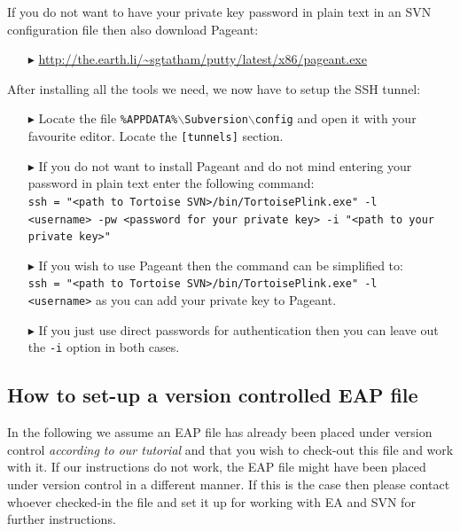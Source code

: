 If you do not want to have your private key password in plain text in an SVN configuration file then also download Pageant:
\begin{enumerate}
  \item[$\blacktriangleright$] {\small \url{http://the.earth.li/~sgtatham/putty/latest/x86/pageant.exe}}  
\end{enumerate}

After installing all the tools we need, we now have to setup the SSH tunnel:
   
\begin{enumerate}
  \item[$\blacktriangleright$] Locate the file \texttt{\%APPDATA\%$\backslash$Subversion$\backslash$config} and open it with your favourite editor. Locate the \texttt{[tunnels]} section.
  \item[$\blacktriangleright$] If you do not want to install Pageant and do not mind entering your password in plain text enter the following command:\\
  \texttt{ssh = "<path to Tortoise SVN>/bin/TortoisePlink.exe" -l \\<username> -pw <password for your private key> -i "<path to your private key>"}
  \item[$\blacktriangleright$] If you wish to use Pageant then the command can be simplified to:\\ \texttt{ssh = "<path to Tortoise SVN>/bin/TortoisePlink.exe" -l \\<username>} as you can add your private key to Pageant.
  \item[$\blacktriangleright$] If you just use direct passwords for authentication then you can leave out the \texttt{-i} option in both cases.
\end{enumerate}

\subsection{How to set-up a version controlled EAP file}
In the following we assume an EAP file has already been placed under version control \emph{according to our tutorial} and that you wish to check-out this file and work with it.
If our instructions do not work, the EAP file might have been placed under version control in a different manner.
If this is the case then please contact whoever checked-in the file and set it up for working with EA and SVN for further instructions.

